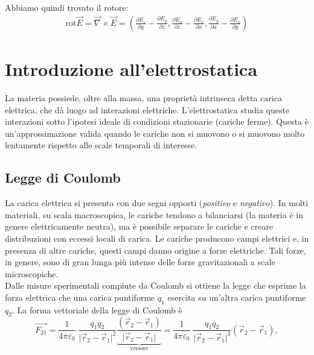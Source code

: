 \documentclass{book}
\begin{document}
Abbiamo quindi trovato il rotore:
\begin{align*}
    \text{rot} \vec{E} = \vec{\nabla} \times \vec{E} = \left( \frac{\partial E_z}{\partial y}-\frac{\partial E_y}{\partial z}, \frac{\partial E_x}{\partial z}- \frac{\partial E_z}{\partial x}, \frac{\partial E_y}{\partial x}- \frac{\partial E_x}{\partial y} \right)
\end{align*}




















\chapter{Introduzione all'elettrostatica}
La materia possiede, oltre alla massa, una proprietà intrinseca detta carica elettrica, che dà luogo ad interazioni elettriche.  
L'elettrostatica studia queste interazioni sotto l'ipotesi ideale di condizioni stazionarie (cariche ferme).
Questa è un'approssimazione valida quando le cariche non si muovono o si muovono molto lentamente rispetto alle scale temporali di interesse.

\section{Legge di Coulomb}
La carica elettrica si presenta con due segni opposti (\emph{positivo} e \emph{negativo}). In molti materiali, su scala macroscopica, le cariche tendono a bilanciarsi (la materia è in genere elettricamente neutra), ma è possibile separare le cariche e creare distribuzioni con eccessi locali di carica. Le cariche producono campi elettrici e, in presenza di altre cariche, questi campi danno origine a forze elettriche. Tali forze, in genere, sono di gran lunga più intense delle forze gravitazionali a scale microscopiche.
\\
Dalle misure sperimentali compiute da Coulomb si ottiene la legge che esprime la forza elettrica che una carica puntiforme \(q_1\) esercita su un'altra carica puntiforme \(q_2\). La forma vettoriale della legge di Coulomb è
\[
\vec{{F}_{21}} 
= \frac{1}{4\pi\varepsilon_0}\;
\frac{q_1 q_2}{ \lvert{\vec{r}_2 - \vec{r}_1 } \rvert ^2} 
\underbrace{\frac{(\vec{r}_2 - \vec{r}_1 )}{\lvert{\vec{r}_2 - \vec{r}_1 } \rvert}}_{\text{versore}} 
= \frac{1}{4\pi\varepsilon_0}\;
\frac{q_1 q_2}{ \lvert{\vec{r}_2 - \vec{r}_1 } \rvert ^3} (\vec{r}_2 - \vec{r}_1 ),
\]
\end{document}
